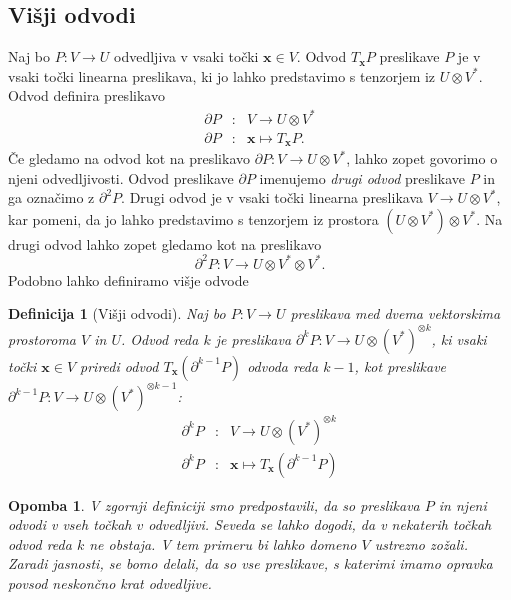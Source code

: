 \documentclass{article}
\newcommand{\x}{\mathbf{x}}
\newcommand{\D}{\partial}
\newtheorem{definicija}{Definicija}[section]
\newtheorem{opomba}{Opomba}[section]
\begin{document}
\subsection{Višji odvodi}
Naj bo $P:V\to U$ odvedljiva v vsaki točki $\x\in V$. Odvod $T_\x P$ preslikave $P$ je v
vsaki točki linearna preslikava, ki jo lahko predstavimo s tenzorjem iz
$U\otimes V^*$. Odvod definira preslikavo 
\begin{eqnarray}
  \label{eq:odvod_preslikava}
  \D P&:& V\to U\otimes V^*\\
  \D P&:& \x \mapsto T_\x P.
\end{eqnarray}
Če gledamo na odvod kot na preslikavo $\D P:V\to U\otimes V^*$, lahko zopet govorimo
o njeni odvedljivosti. Odvod preslikave $\D P$ imenujemo \emph{drugi odvod}
preslikave $P$ in ga označimo z $\D^2P$. Drugi odvod je v vsaki točki linearna
preslikava $V\to U\otimes V^*$, kar pomeni, da jo lahko predstavimo s tenzorjem
iz prostora $(U\otimes V^*)\otimes V^*$. Na drugi odvod lahko zopet gledamo kot
na preslikavo 
$$\D^2 P:V\to U\otimes V^*\otimes V^*.$$ 
Podobno lahko definiramo višje odvode

\begin{definicija}[Višji odvodi]
  Naj bo $P:V\to U$ preslikava med dvema vektorskima prostoroma $V$ in $U$. Odvod reda $k$ je preslikava $\D^kP:V\to U\otimes(V^*)^{\otimes k}$, ki
  vsaki točki $\x\in V$ priredi odvod $T_\x(\D^{k-1}P)$ odvoda reda $k-1$, kot
  preslikave $\D^{k-1}P: V\to U\otimes (V^*)^{\otimes k-1}$:
  \begin{eqnarray}\label{eq:partial}
    \label{eq:visji_odvod}
    \D^kP&:&V\to U\otimes (V^*)^{\otimes k}\\
    \D^kP&:&\x\mapsto T_\x\left( \D^{k-1}P \right)
  \end{eqnarray}
\end{definicija} 
\begin{opomba}
   V zgornji definiciji smo predpostavili, da so preslikava $P$ in njeni odvodi v
  vseh točkah $v$ odvedljivi. Seveda se lahko dogodi, da v nekaterih točkah
  odvod reda $k$ ne obstaja. V tem primeru bi lahko domeno $V$ ustrezno zožali.
  Zaradi jasnosti, se bomo delali, da so vse preslikave, s katerimi imamo
  opravka povsod neskončno krat odvedljive.
\end{opomba}
\end{document}
